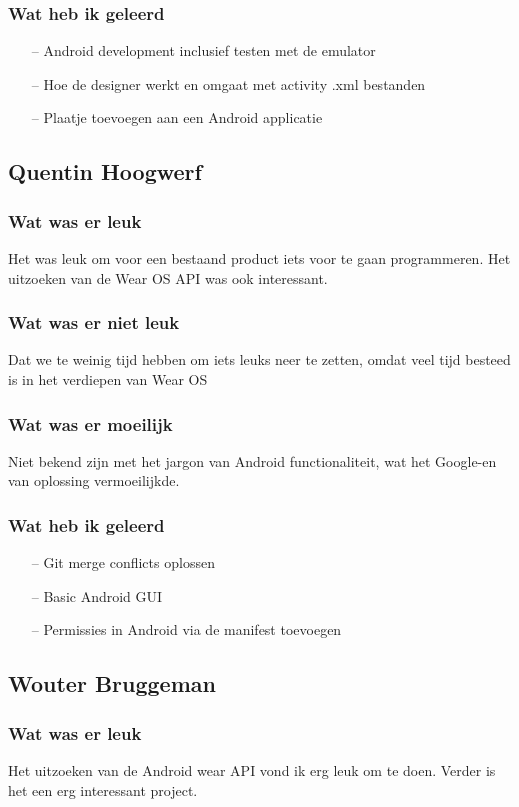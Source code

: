 \documentclass[../main.tex]{subfiles}
\begin{document}
\subsubsection{Wat heb ik geleerd}
\begin{itemize}
	\item[--] Android development inclusief testen met de emulator
	\item[--] Hoe de designer werkt en omgaat met activity .xml bestanden
	\item[--] Plaatje toevoegen aan een Android applicatie
\end{itemize}
\newpage

\subsection{Quentin Hoogwerf}
\subsubsection{Wat was er leuk}
Het was leuk om voor een bestaand product iets voor te gaan programmeren. Het uitzoeken van de
Wear OS API was ook interessant.
\subsubsection{Wat was er niet leuk}
Dat we te weinig tijd hebben om iets leuks neer te zetten, omdat veel tijd besteed is in het verdiepen
van Wear OS
\subsubsection{Wat was er moeilijk}
Niet bekend zijn met het jargon van Android functionaliteit, wat het Google-en van oplossing
vermoeilijkde.
\subsubsection{Wat heb ik geleerd}
\begin{itemize}
	\item[--] Git merge conflicts oplossen
	\item[--] Basic Android GUI
	\item[--] Permissies in Android via de manifest toevoegen
\end{itemize}
\newpage

\subsection{Wouter Bruggeman}
\subsubsection{Wat was er leuk}
Het uitzoeken van de Android wear API vond ik erg leuk om te doen. Verder is het een erg
interessant project.
\end{document}
